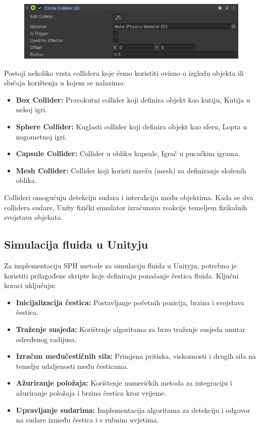 \documentclass[diplomskirad]{fer}
\begin{document}
    \begin{figure}[H]
        \centering
        \includegraphics[scale=0.5]{images/circleCollider}
        \label{fig:circleCollider}
    \end{figure}

    Postoji nekoliko vrsta collidera koje ćemo koristiti ovisno o izgledu objekta ili slučaja korištenja u kojem se nalazimo:
    \begin{itemize}
        \item \textbf{Box Collider:} Pravokutni collider koji definira objekt kao kutiju, Kutija u nekoj igri.
        \item \textbf{Sphere Collider:} Kuglasti collider koji definira objekt kao sferu, Lopta u nogometnoj igri.
        \item \textbf{Capsule Collider:} Collider u obliku kapsule, Igrač u pucačkim igrama.
        \item \textbf{Mesh Collider:} Collider koji koristi mrežu (mesh) za definiranje složenih oblika.
    \end{itemize}

    Collideri omogućuju detekciju sudara i interakciju među objektima.
    Kada se dva collidera sudare, Unity fizički simulator izračunava reakcije temeljem fizikalnih svojstava objekata.

    \subsection{Simulacija fluida u Unityju}\label{subsec:simulacija-fluida-u-unityju}
    Za implementaciju SPH metode za simulaciju fluida u Unityju, potrebno je koristiti prilagođene skripte koje definiraju ponašanje čestica fluida.
    Ključni koraci uključuju:
    \begin{itemize}
        \item \textbf{Inicijalizacija čestica:} Postavljanje početnih pozicija, brzina i svojstava čestica.
        \item \textbf{Traženje susjeda:} Korištenje algoritama za brzo traženje susjeda unutar određenog radijusa.
        \item \textbf{Izračun međučestičnih sila:} Primjena pritiska, viskoznosti i drugih sila na temelju udaljenosti među česticama.
        \item \textbf{Ažuriranje položaja:} Korištenje numeričkih metoda za integraciju i ažuriranje položaja i brzina čestica kroz vrijeme.
        \item \textbf{Upravljanje sudarima:} Implementacija algoritama za detekciju i odgovor na sudare između čestica i s rubnim uvjetima.
    \end{itemize}
\end{document}
